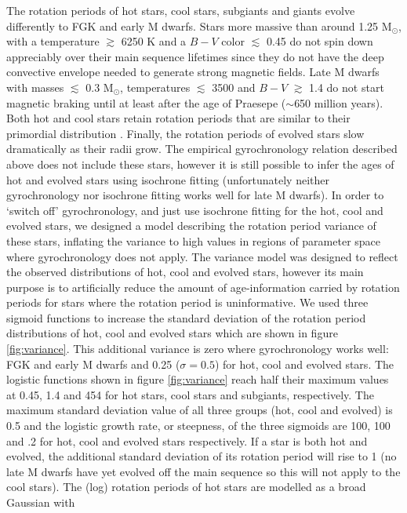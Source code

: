 The rotation periods of hot stars, cool stars, subgiants and giants evolve
differently to FGK and early M dwarfs.
Stars more massive than around 1.25 M$_\odot$, with a temperature $\gtrsim$
6250 K and a $B-V$ color $\lesssim$ 0.45 do not spin down appreciably over
their main sequence lifetimes since they do not have the deep convective
envelope needed to generate strong magnetic fields.
Late M dwarfs with masses $\lesssim$ 0.3 M$_\odot$, temperatures $\lesssim$
3500 and $B-V$ $\gtrsim$ 1.4 do not start magnetic braking until at least
after the age of Praesepe ($\sim$650 million years).
Both hot and cool stars retain rotation periods that are similar to their
primordial distribution \citep[see \eg][]{matt2012}.
Finally, the rotation periods of evolved stars slow dramatically as their
radii grow.
The empirical gyrochronology relation described above does not include these
stars, however it is still possible to infer the ages of hot and evolved stars
using isochrone fitting (unfortunately neither gyrochronology nor isochrone
fitting works well for late M dwarfs).
In order to `switch off' gyrochronology, and just use isochrone fitting for
the hot, cool and evolved stars, we designed a model describing the rotation
period variance of these stars, inflating the variance to high values in
regions of parameter space where gyrochronology does not apply.
The variance model was designed to reflect the observed distributions of hot,
cool and evolved stars, however its main purpose is to artificially reduce the
amount of age-information carried by rotation periods for stars where the
rotation period is uninformative.
We used three sigmoid functions to increase the standard deviation of the
rotation period distributions of hot, cool and evolved stars which are shown
in figure \ref{fig:variance}.
This additional variance is zero where gyrochronology works well: FGK and
early M dwarfs and 0.25 ($\sigma = 0.5$) for hot, cool and evolved stars.
The logistic functions shown in figure \ref{fig:variance} reach half their
maximum values at 0.45, 1.4 and 454 for hot stars, cool stars and subgiants,
respectively.
The maximum standard deviation value of all three groups (hot, cool and
evolved) is 0.5 and the logistic growth rate, or steepness, of the three
sigmoids are 100, 100 and .2 for hot, cool and evolved stars respectively.
If a star is both hot and evolved, the additional standard deviation of its
rotation period will rise to 1 (no late M dwarfs have yet evolved off the main
sequence so this will not apply to the cool stars).
The (log) rotation periods of hot stars are modelled as a broad Gaussian with
